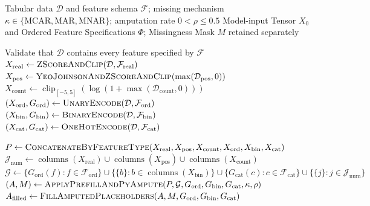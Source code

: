\begin{algorithm}[ht]
\footnotesize
\caption{Feature-Type-Specific Preprocessing, Synthetic Amputation, and Placeholder Filling}
\label{algo:data_preprocessing}
\begin{algorithmic}[1]%
\setlength{\itemsep}{0.3em}
\Require Tabular data $\mathcal D$ and feature schema $\mathcal F$;
         missing mechanism $\kappa \in\{\mathrm{MCAR},\mathrm{MAR},\mathrm{MNAR}\}$;
         amputation rate $0<\rho\leq 0.5$
\Ensure Model-input Tensor $X_0$ and Ordered Feature Specifications $\Phi$;
        Missingness Mask $M$ retained separately

\Statex
{}
  \State Validate that $\mathcal D$ contains every feature specified by $\mathcal F$
  \State $X_{\mathrm{real}}\gets
         \textsc{ZScoreAndClip}(\mathcal D,\mathcal F_{\mathrm{real}})$
  \State $X_{\mathrm{pos}}\gets
         \textsc{YeoJohnsonAndZScoreAndClip}(\max(\mathcal D_{\mathrm{pos}},0))$
  \State $X_{\mathrm{count}}\gets
         \operatorname{clip}_{[-5,5]}\!\left(\log\!\left(1+\max(\mathcal D_{\mathrm{count}},0)\right)\right)$
  \State $(X_{\mathrm{ord}},G_{\mathrm{ord}})\gets
         \textsc{UnaryEncode}(\mathcal D,\mathcal F_{\mathrm{ord}})$
  \State $(X_{\mathrm{bin}},G_{\mathrm{bin}})\gets
         \textsc{BinaryEncode}(\mathcal D,\mathcal F_{\mathrm{bin}})$
  \State $(X_{\mathrm{cat}},G_{\mathrm{cat}})\gets
         \textsc{OneHotEncode}(\mathcal D,\mathcal F_{\mathrm{cat}})$

  \State $P\gets\textsc{ConcatenateByFeatureType}
         (X_{\mathrm{real}},X_{\mathrm{pos}},X_{\mathrm{count}},
          X_{\mathrm{ord}},X_{\mathrm{bin}},X_{\mathrm{cat}})$
  \State $\mathcal J_{\mathrm{num}}\gets
         \operatorname{columns}(X_{\mathrm{real}})
         \cup\operatorname{columns}(X_{\mathrm{pos}})
         \cup\operatorname{columns}(X_{\mathrm{count}})$
  \State $\mathcal G\gets
         \{G_{\mathrm{ord}}(f):f\in\mathcal F_{\mathrm{ord}}\}
         \cup\{\{b\}:b\in\operatorname{columns}(X_{\mathrm{bin}})\}
         \cup\{G_{\mathrm{cat}}(c):c\in\mathcal F_{\mathrm{cat}}\}
         \cup\{\{j\}:j\in\mathcal J_{\mathrm{num}}\}$
  \State $(A,M)\gets\textsc{ApplyPrefillAndPyAmpute}
         (P,\mathcal G,G_{\mathrm{ord}},G_{\mathrm{bin}},G_{\mathrm{cat}},\kappa,\rho)$
  \State $A_{\mathrm{filled}}\gets\textsc{FillAmputedPlaceholders}
         (A,M,G_{\mathrm{ord}},G_{\mathrm{bin}},G_{\mathrm{cat}})$


\end{algorithmic}
\end{algorithm}
